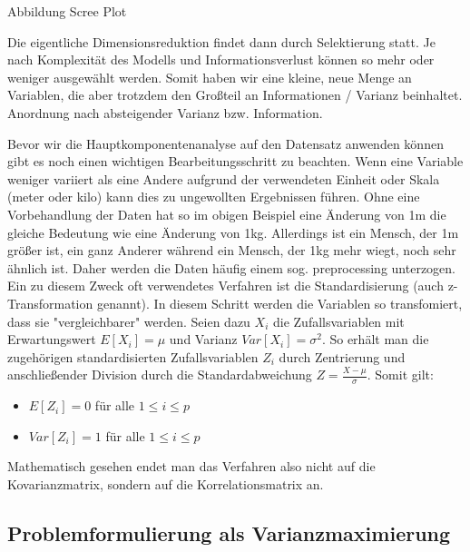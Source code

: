 Abbildung Scree Plot

Die eigentliche Dimensionsreduktion findet dann durch Selektierung statt. Je nach Komplexität des Modells und Informationsverlust können so mehr oder weniger ausgewählt werden. Somit haben wir eine kleine, neue Menge an Variablen, die aber trotzdem den Großteil an Informationen / Varianz beinhaltet. Anordnung nach absteigender Varianz bzw. Information.

Bevor wir die Hauptkomponentenanalyse auf den Datensatz anwenden können gibt es noch einen wichtigen Bearbeitungsschritt zu beachten. Wenn eine Variable weniger variiert als eine Andere aufgrund der verwendeten Einheit oder Skala (meter oder kilo) kann dies zu ungewollten Ergebnissen führen. Ohne eine Vorbehandlung der Daten hat so im obigen Beispiel eine Änderung von 1m die gleiche Bedeutung wie eine Änderung von 1kg. Allerdings ist ein Mensch, der 1m größer ist, ein ganz Anderer während ein Mensch, der 1kg mehr wiegt, noch sehr ähnlich ist. Daher werden die Daten häufig einem sog. preprocessing unterzogen. Ein zu diesem Zweck oft verwendetes Verfahren ist die Standardisierung (auch z-Transformation genannt). In diesem Schritt werden die Variablen so transfomiert, dass sie "vergleichbarer" werden. Seien dazu $X_i$ die Zufallsvariablen mit Erwartungswert $E[X_i] = \mu$ und Varianz $Var[X_i] = \sigma^2$. So erhält man die zugehörigen standardisierten Zufallsvariablen $Z_i$ durch Zentrierung und anschließender Division durch die Standardabweichung $Z = \frac{X-\mu}{\sigma}$. Somit gilt:
\begin{itemize}
\item $E[Z_i] = 0$ für alle $1 \leq i \leq p$
\item $Var[Z_i] = 1$ für alle $1 \leq i \leq p$
\end{itemize}
Mathematisch gesehen endet man das Verfahren also nicht auf die Kovarianzmatrix, sondern auf die Korrelationsmatrix an.

\subsection{Problemformulierung als Varianzmaximierung}

